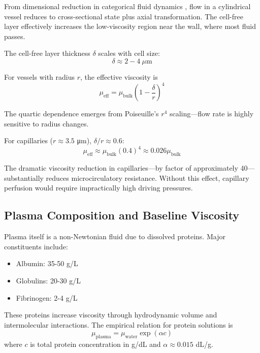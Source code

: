 \documentclass[12pt,a4paper]{article}
\theoremstyle{remark}
\begin{document}
From dimensional reduction in categorical fluid dynamics \cite{sachikonye2024fluid}, flow in a cylindrical vessel reduces to cross-sectional state plus axial transformation. The cell-free layer effectively increases the low-viscosity region near the wall, where most fluid passes.

The cell-free layer thickness $\delta$ scales with cell size:
\begin{equation}
\delta \approx 2-4~\mu\mathrm{m}
\end{equation}

For vessels with radius $r$, the effective viscosity is
\begin{equation}
\mu_{\mathrm{eff}} = \mu_{\mathrm{bulk}}\left(1 - \frac{\delta}{r}\right)^{4}
\end{equation}

The quartic dependence emerges from Poiseuille's $r^{4}$ scaling—flow rate is highly sensitive to radius changes.

For capillaries ($r \approx 3.5$ μm), $\delta/r \approx 0.6$:
\begin{equation}
\mu_{\mathrm{eff}} \approx \mu_{\mathrm{bulk}}(0.4)^{4} \approx 0.026\mu_{\mathrm{bulk}}
\end{equation}

The dramatic viscosity reduction in capillaries—by factor of approximately 40—substantially reduces microcirculatory resistance. Without this effect, capillary perfusion would require impractically high driving pressures.

\subsection{Plasma Composition and Baseline Viscosity}

Plasma itself is a non-Newtonian fluid due to dissolved proteins. Major constituents include:
\begin{itemize}
\item Albumin: 35-50 g/L
\item Globulins: 20-30 g/L
\item Fibrinogen: 2-4 g/L
\end{itemize}

These proteins increase viscosity through hydrodynamic volume and intermolecular interactions. The empirical relation for protein solutions is
\begin{equation}
\mu_{\mathrm{plasma}} = \mu_{\mathrm{water}} \exp(\alpha c)
\end{equation}
where $c$ is total protein concentration in g/dL and $\alpha \approx 0.015$ dL/g.
\end{document}
